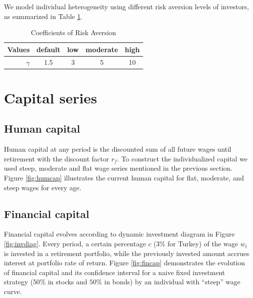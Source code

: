 We model individual heterogeneity using different risk aversion levels of investors, as summarized in Table \ref{table:riskave}.

\begin{table}[h!]
	\centering
	\caption{Coefficients of Risk Aversion}
	\label{table:riskave}
	\begin{tabular}[c]{r|cccc}
		Values&default&low&moderate&high\\
		\hline
		$\gamma$&1.5&3&5&10\\
	\end{tabular}
\end{table}

\section{Capital series}

\subsection{Human capital}
Human capital at any period is the discounted sum of all future wages until retirement with the discount factor $r_f$. To construct the individualized capital we used steep, moderate and flat wage series mentioned in the previous section. Figure \ref{fig:humcap} illustrates the current human capital for flat, moderate, and steep wages for every age. 

\subsection{Financial capital}

Financial capital evolves according to dynamic investment diagram in Figure \ref{fig:invdiag}. Every period, a certain percentage $c$ ($3\%$ for Turkey) of the wage $w_t$ is invested in a retirement portfolio, while the previously invested amount accrues interest at portfolio rate of return. Figure \ref{fig:fincap} demonstrates the evolution of financial capital and its confidence interval for a naive fixed investment strategy ($50\%$ in stocks and $50\%$ in bonds) by an individual with ``steep'' wage curve.

